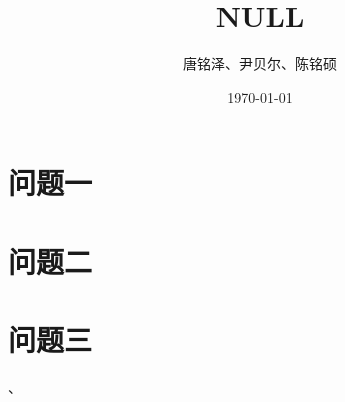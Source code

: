 \documentclass[UTF8]{ctexart}
\title{NULL}
\author{唐铭泽、尹贝尔、陈铭硕}
\date{\today}
\begin{document}
\maketitle
\section{问题一}
\section{问题二}
\section{问题三}、
\end{document}
